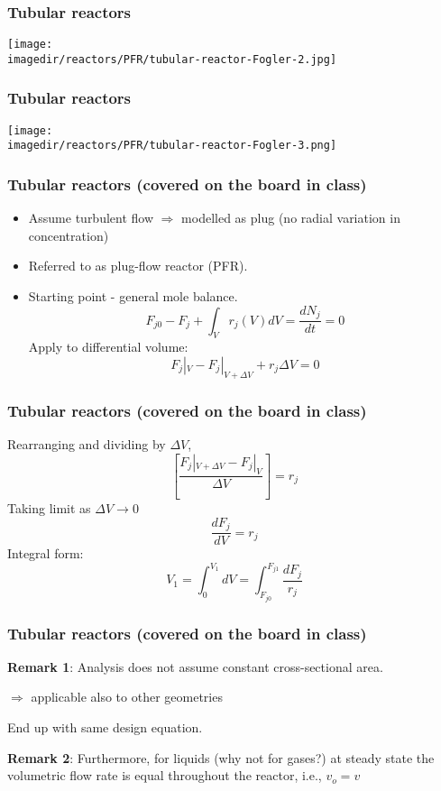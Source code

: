 \begin{frame}\frametitle{Tubular reactors}
	\begin{center}
		\texttt{[image: \\imagedir/reactors/PFR/tubular-reactor-Fogler-2.jpg]}
	\end{center}
\end{frame}

\begin{frame}\frametitle{Tubular reactors}
	\begin{center}
		\texttt{[image: \\imagedir/reactors/PFR/tubular-reactor-Fogler-3.png]}
	\end{center}
\end{frame}

\begin{frame}\frametitle{Tubular reactors (covered on the board in class)}
	\vspace{-0.5em}
	\begin{itemize}
		\item	Assume turbulent flow $\Rightarrow$ modelled as plug (no radial variation in concentration)
		\item	Referred to as plug-flow reactor (PFR).
		\item	Starting point - general mole balance. $$F_{j0} - F_j + \int_Vr_j(V)dV = \frac{dN_j}{dt} = 0$$ Apply to differential volume: $$F_j|_V - F_j|_{V + \Delta V} + r_j\Delta V = 0$$
	\end{itemize}
\end{frame}

\begin{frame}\frametitle{Tubular reactors (covered on the board in class)}
	Rearranging and dividing by $\Delta V$, $$\left[\frac{F_j|_{V+\Delta V} - F_j|_V}{\Delta V}\right] = r_j$$ Taking limit as $\Delta V \rightarrow 0$ $$\boxed{\frac{dF_j}{dV} = r_j}$$ Integral form: $$V_1 = \int_0^{V_1}dV = \int_{F_{j0}}^{F_{j1}}\frac{dF_j}{r_j}$$
\end{frame}

\begin{frame}\frametitle{Tubular reactors (covered on the board in class)}
	\textbf{Remark 1}: Analysis does not assume constant cross-sectional area.

	$\Rightarrow$ applicable also to other geometries

	End up with same design equation.

	\vspace{24pt}

	\textbf{Remark 2}: Furthermore, for liquids (why not for gases?) at steady state the volumetric flow rate is equal throughout the reactor, i.e., $v_o=v$
\end{frame}

